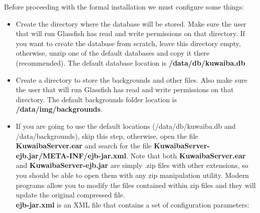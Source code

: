 \documentclass[a4paper]{article}
\begin{document}
			Before proceeding with the formal installation we must configure some things:
			\begin{itemize}
				\item Create the directory where the database will be stored. Make sure the user that will run Glassfish has read and write permissions on that directory. If you want to create the database from scratch, leave this directory empty, otherwise, unzip one of the default databases and copy it there (recommended). The default database location is \textbf{/data/db/kuwaiba.db}
				\item Create a directory to store the backgrounds and other files. Also make sure the user that will run Glassfish has read and write permissions on that directory. The default backgrounds folder location is \textbf{/data/img/backgrounds}.
				\item If you are going to use the default locations (/data/db/kuwaiba.db and /data/backgrounds), skip this step, otherwise, open the file \textbf{KuwaibaServer.ear} and search for the file  \textbf{KuwaibaServer-ejb.jar/META-INF/ejb-jar.xml}. Note that both \textbf{KuwaibaServer.ear} and \textbf{KuwaibaServer-ejb.jar} are simply .zip files with other extensions, so you should be able to open them with any zip manipulation utility. Modern programs allow you to modify the files contained within zip files and they will update the original compressed file.\\ 
				
				\textbf{ejb-jar.xml} is an XML file that contains a set of configuration parameters:
				

\end{itemize}
\end{document}
